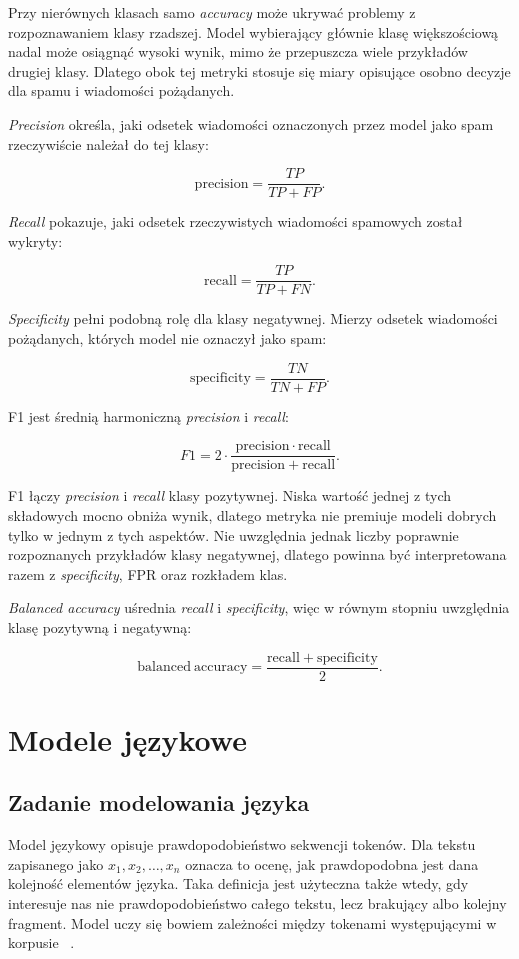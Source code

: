 Przy nierównych klasach samo \emph{accuracy} może ukrywać problemy z
rozpoznawaniem klasy rzadszej. Model wybierający głównie klasę większościową
nadal może osiągnąć wysoki wynik, mimo że przepuszcza wiele przykładów drugiej
klasy. Dlatego obok tej metryki stosuje się miary opisujące osobno decyzje dla
spamu i wiadomości pożądanych.

\emph{Precision} określa, jaki odsetek wiadomości oznaczonych przez model jako
spam rzeczywiście należał do tej klasy:

\[
\mathrm{precision} =
\frac{TP}{TP + FP}.
\]

\emph{Recall} pokazuje, jaki odsetek rzeczywistych wiadomości spamowych został
wykryty:

\[
\mathrm{recall} =
\frac{TP}{TP + FN}.
\]

\emph{Specificity} pełni podobną rolę dla klasy negatywnej. Mierzy odsetek
wiadomości pożądanych, których model nie oznaczył jako spam:

\[
\mathrm{specificity} =
\frac{TN}{TN + FP}.
\]

F1 jest średnią harmoniczną \emph{precision} i \emph{recall}:

\[
F1 =
2 \cdot \frac{\mathrm{precision} \cdot \mathrm{recall}}
{\mathrm{precision} + \mathrm{recall}}.
\]

F1 łączy \emph{precision} i \emph{recall} klasy pozytywnej. Niska wartość jednej
z tych składowych mocno obniża wynik, dlatego metryka nie premiuje modeli dobrych
tylko w jednym z tych aspektów. Nie uwzględnia jednak liczby poprawnie
rozpoznanych przykładów klasy negatywnej, dlatego powinna być interpretowana
razem z \emph{specificity}, FPR oraz rozkładem klas.

\emph{Balanced accuracy} uśrednia \emph{recall} i \emph{specificity}, więc w
równym stopniu uwzględnia klasę pozytywną i negatywną:

\[
\mathrm{balanced\ accuracy} =
\frac{\mathrm{recall} + \mathrm{specificity}}{2}.
\]


\section{Modele językowe}

\subsection{Zadanie modelowania języka}

Model językowy opisuje prawdopodobieństwo sekwencji tokenów. Dla tekstu
zapisanego jako \(x_1, x_2, \ldots, x_n\) oznacza to ocenę, jak prawdopodobna
jest dana kolejność elementów języka. Taka definicja jest użyteczna także wtedy,
gdy interesuje nas nie prawdopodobieństwo całego tekstu, lecz brakujący albo
kolejny fragment. Model uczy się bowiem zależności między tokenami
występującymi w korpusie
~\autocite{bengio-neural-probabilistic-language-model}.

